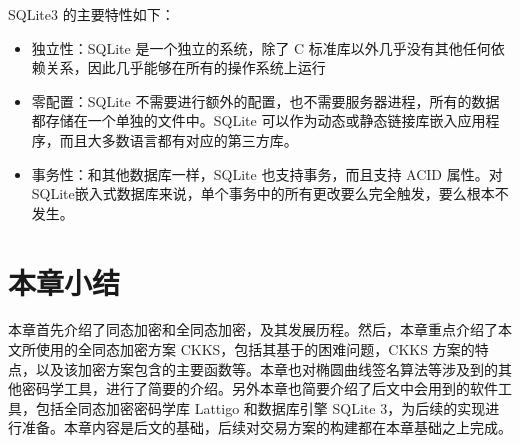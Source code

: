 SQLite3 的主要特性如下：\cite{sqlite3_2}

\begin{itemize}
    \item 独立性：SQLite 是一个独立的系统，除了 C 标准库以外几乎没有其他任何依赖关系，因此几乎能够在所有的操作系统上运行
    \item 零配置：SQLite 不需要进行额外的配置，也不需要服务器进程，所有的数据都存储在一个单独的文件中。SQLite 可以作为动态或静态链接库嵌入应用程序，而且大多数语言都有对应的第三方库。
    \item 事务性：和其他数据库一样，SQLite 也支持事务，而且支持 ACID 属性。对SQLite嵌入式数据库来说，单个事务中的所有更改要么完全触发，要么根本不发生。
\end{itemize}



\section{本章小结}

本章首先介绍了同态加密和全同态加密，及其发展历程。然后，本章重点介绍了本文所使用的全同态加密方案 CKKS，包括其基于的困难问题，CKKS 方案的特点，以及该加密方案包含的主要函数等。本章也对椭圆曲线签名算法等涉及到的其他密码学工具，进行了简要的介绍。另外本章也简要介绍了后文中会用到的软件工具，包括全同态加密密码学库 Lattigo 和数据库引擎 SQLite 3，为后续的实现进行准备。本章内容是后文的基础，后续对交易方案的构建都在本章基础之上完成。
